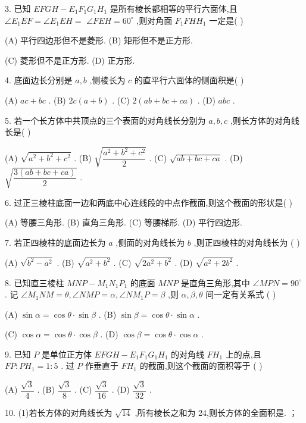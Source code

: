 3. 已知 ${EFGH} - {E}_{1}{F}_{1}{G}_{1}{H}_{1}$ 是所有棱长都相等的平行六面体,且 $\angle {E}_{1}{EF} = \angle {E}_{1}{EH} =$  $\angle {FEH} = {60}^{ \circ  }$ ,则对角面 ${F}_{1}{FH}{H}_{1}$ 一定是(   )

(A) 平行四边形但不是菱形. (B) 矩形但不是正方形.

(C) 菱形但不是正方形. (D) 正方形.

4. 底面边长分别是 $a,b$ ,侧棱长为 $c$ 的直平行六面体的侧面积是(   )

(A) ${ac} + {bc}$ . (B) ${2c}\left( {a + b}\right)$ . (C) $2\left( {{ab} + {bc} + {ca}}\right)$ . (D) ${abc}$ .

5. 若一个长方体中共顶点的三个表面的对角线长分别为 $a,b,c$ ,则长方体的对角线长是(   )

(A) $\sqrt{{a}^{2} + {b}^{2} + {c}^{2}}$ . (B) $\sqrt{\dfrac{{a}^{2} + {b}^{2} + {c}^{2}}{2}}$ . (C) $\sqrt{{ab} + {bc} + {ca}}$ . (D) $\sqrt{\dfrac{3\left( {{ab} + {bc} + {ca}}\right) }{2}}$ .

6. 过正三棱柱底面一边和两底中心连线段的中点作截面,则这个截面的形状是(   )

(A) 等腰三角形. (B) 直角三角形. (C) 等腰梯形. (D) 平行四边形.

7. 若正四棱柱的底面边长为 $a$ ,侧面的对角线长为 $b$ ,则正四棱柱的对角线长为 (   )

(A) $\sqrt{{b}^{2} - {a}^{2}}$ . (B) $\sqrt{{a}^{2} + {b}^{2}}$ . (C) $\sqrt{2{a}^{2} + {b}^{2}}$ . (D) $\sqrt{{a}^{2} + 2{b}^{2}}$ .

8. 已知直三棱柱 ${MNP} - {M}_{1}{N}_{1}{P}_{1}$ 的底面 ${MNP}$ 是直角三角形,其中 $\angle {MPN} = {90}^{ \circ  }$ . 记 $\angle {M}_{1}{NM} = \theta ,\angle {NMP} = \alpha ,\angle N{M}_{1}P = \beta$ ,则 $\alpha ,\beta ,\theta$ 间一定有关系式 (   )

(A) $\sin \alpha  = \cos \theta  \cdot  \sin \beta$ . (B) $\sin \beta  = \cos \theta  \cdot  \sin \alpha$ .

(C) $\cos \alpha  = \cos \theta  \cdot  \cos \beta$ . (D) $\cos \beta  = \cos \theta  \cdot  \cos \alpha$ .

9. 已知 $P$ 是单位正方体 ${EFGH} - {E}_{1}{F}_{1}{G}_{1}{H}_{1}$ 的对角线 $F{H}_{1}$ 上的点,且 ${FP} : P{H}_{1} = 1 : 5$ . 过 $P$ 作垂直于 $F{H}_{1}$ 的截面,则这个截面的面积等于 (   )

(A) $\dfrac{\sqrt{3}}{4}$ . (B) $\dfrac{\sqrt{3}}{8}$ . (C) $\dfrac{\sqrt{3}}{16}$ . (D) $\dfrac{\sqrt{3}}{32}$ .

10. (1)若长方体的对角线长为 $\sqrt{14}$ ,所有棱长之和为 24,则长方体的全面积是\blkda{}. ；

